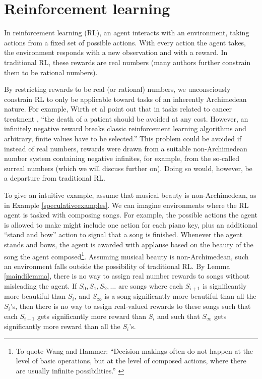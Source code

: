 \documentclass[reqno]{article}
\theoremstyle{definition}
\begin{document}
\section{Reinforcement learning}

In reinforcement learning (RL), an agent interacts with an environment,
taking actions from a fixed set of possible actions. With every action the
agent takes, the environment responds with a new observation and with a
reward. In traditional RL, these rewards are real numbers (many
authors further constrain them to be rational numbers).

By restricting rewards to be real (or rational) numbers, we unconsciously
constrain RL to only be applicable toward tasks of an inherently Archimedean
nature. For example, Wirth et al point out \cite{wirth2017survey} that
in tasks related to cancer treatment \cite{zhao2009reinforcement},
``the death of a patient should be avoided at any cost. However, an
infinitely negative reward breaks classic reinforcement learning algorithms
and arbitrary, finite values have to be selected.'' This problem could be
avoided if instead of real numbers, rewards were drawn from a suitable
non-Archimedean number system containing negative infinites,
for example, from the so-called
surreal numbers (which we will discuss further on). Doing so would, however,
be a departure from traditional RL.

To give an intuitive example, assume that musical beauty is non-Archimedean,
as in Example \ref{speculativeexamples}. We can imagine environments where the
RL agent is tasked with composing songs. For example, the possible actions the
agent is allowed to make might include one action for each piano key, plus
an additional ``stand and bow'' action to signal that a song is
finished.
Whenever the agent stands and bows, the agent is awarded with applause based on
the beauty of the song the agent
composed\footnote{To quote Wang and Hammer: ``Decision makings often do not happen
at the level of basic operations, but at the level of composed actions, where
there are usually infinite possibilities.'' \cite{wang2015assumptions}}. Assuming
musical beauty is
non-Archimedean, such an environment falls outside the possibility of traditional
RL. By Lemma \ref{maindilemma}, there is no way to assign real number
rewards to songs without misleading the agent. If $S_0,S_1,S_2,\ldots$ are songs
where each $S_{i+1}$ is significantly more beautiful than $S_i$, and $S_\infty$
is a song significantly more beautiful than all the $S_i$'s, then there is no way to
assign real-valued rewards to these songs such that each $S_{i+1}$ gets
significantly more reward than $S_i$ and such that $S_\infty$ gets significantly
more reward than all the $S_i$'s.
\end{document}
